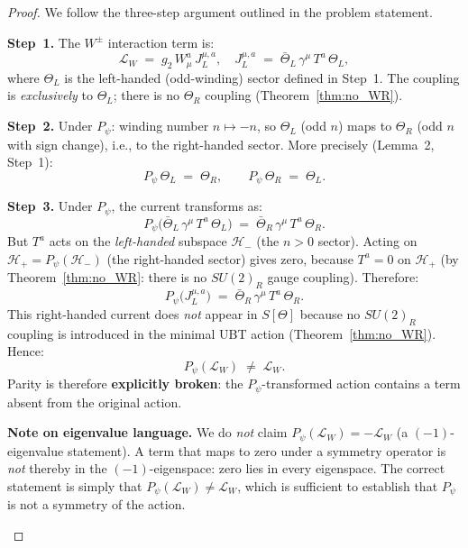 \documentclass[12pt,a4paper]{article}
\theoremstyle{definition}
\theoremstyle{remark}
\begin{document}
\begin{proof}
We follow the three-step argument outlined in the problem statement.

\textbf{Step~1.} The $W^\pm$ interaction term is:
\begin{equation}
  \mathcal{L}_{W} \;=\; g_2\,W^a_\mu\,J^{\mu,a}_L,
  \quad
  J^{\mu,a}_L \;=\; \bar{\Theta}_L\,\gamma^\mu\,T^a\,\Theta_L,
\end{equation}
where $\Theta_L$ is the left-handed (odd-winding) sector defined in
Step~1.  The coupling is \emph{exclusively} to $\Theta_L$; there is
no $\Theta_R$ coupling (Theorem~\ref{thm:no_WR}).

\textbf{Step~2.} Under $P_\psi$: winding number $n \mapsto -n$,
so $\Theta_L$ (odd $n$) maps to $\Theta_R$ (odd $n$ with sign change),
i.e., to the right-handed sector.  More precisely (Lemma~2, Step~1):
\begin{equation}
  P_\psi\,\Theta_L \;=\; \Theta_R, \qquad
  P_\psi\,\Theta_R \;=\; \Theta_L.
\end{equation}

\textbf{Step~3.} Under $P_\psi$, the current transforms as:
\begin{equation}
  P_\psi\bigl(\bar{\Theta}_L\,\gamma^\mu\,T^a\,\Theta_L\bigr)
  \;=\; \bar{\Theta}_R\,\gamma^\mu\,T^a\,\Theta_R.
\end{equation}
But $T^a$ acts on the \emph{left-handed} subspace $\mathcal{H}_-$
(the $n > 0$ sector).  Acting on $\mathcal{H}_+ = P_\psi(\mathcal{H}_-)$
(the right-handed sector) gives zero, because $T^a = 0$ on $\mathcal{H}_+$
(by Theorem~\ref{thm:no_WR}: there is no $SU(2)_R$ gauge coupling).
Therefore:
\begin{equation}
  P_\psi\bigl(J^{\mu,a}_L\bigr)
  \;=\; \bar{\Theta}_R\,\gamma^\mu\,T^a\,\Theta_R.
\end{equation}
This right-handed current does \emph{not} appear in $S[\Theta]$ because
no $SU(2)_R$ coupling is introduced in the minimal UBT action
(Theorem~\ref{thm:no_WR}).  Hence:
\begin{equation}
  P_\psi(\mathcal{L}_W) \;\neq\; \mathcal{L}_W.
\end{equation}
Parity is therefore \textbf{explicitly broken}: the $P_\psi$-transformed
action contains a term absent from the original action.

\begin{gapbox}
\textbf{Note on eigenvalue language.}
We do \emph{not} claim $P_\psi(\mathcal{L}_W) = -\mathcal{L}_W$ (a
$(-1)$-eigenvalue statement).  A term that maps to zero under a symmetry
operator is \emph{not} thereby in the $(-1)$-eigenspace: zero lies in
every eigenspace.  The correct statement is simply that
$P_\psi(\mathcal{L}_W) \neq \mathcal{L}_W$, which is sufficient to
establish that $P_\psi$ is not a symmetry of the action.
\end{gapbox}
\end{proof}
\end{document}
